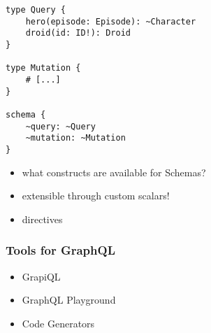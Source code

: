 \begin{lstlisting}[caption={Query and Mutation types}, language=graphqls]
type Query {
    hero(episode: Episode): ~Character
    droid(id: ID!): Droid
}

type Mutation { 
    # [...]
}

schema {
    ~query: ~Query
    ~mutation: ~Mutation
}      
\end{lstlisting}

\begin{itemize}
    \item what constructs are available for Schemas?
    \item extensible through custom scalars!
    \item directives
\end{itemize}

\subsubsection{Tools for GraphQL}

\begin{itemize}
    \item GrapiQL
    \item GraphQL Playground
    \item Code Generators
\end{itemize}
